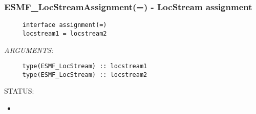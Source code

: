  
\setlength{\oldparskip}{\parskip}
\setlength{\parskip}{1.5ex}
\setlength{\oldparindent}{\parindent}
\setlength{\parindent}{0pt}
\setlength{\oldbaselineskip}{\baselineskip}
\setlength{\baselineskip}{11pt}
 
\def\bv{\begin{verbatim}}
\def\ev{\end{verbatim}}
\def\be{\begin{equation}}
\def\ee{\end{equation}}
\def\bea{\begin{eqnarray}}
\def\eea{\end{eqnarray}}
\def\bi{\begin{itemize}}
\def\ei{\end{itemize}}
\def\bn{\begin{enumerate}}
\def\en{\end{enumerate}}
\def\bd{\begin{description}}
\def\ed{\end{description}}
\def\({\left (}
\def\){\right )}
\def\[{\left [}
\def\]{\right ]}
\def\<{\left  \langle}
\def\>{\right \rangle}
\def\cI{{\cal I}}
\def\diag{\mathop{\rm diag}}
\def\tr{\mathop{\rm tr}}


 
\subsubsection [ESMF\_LocStreamAssignment(=)] {ESMF\_LocStreamAssignment(=) - LocStream assignment}


  
\begin{verbatim}     interface assignment(=)
     locstream1 = locstream2\end{verbatim}{\em ARGUMENTS:}
\begin{verbatim}     type(ESMF_LocStream) :: locstream1
     type(ESMF_LocStream) :: locstream2\end{verbatim}
{\sf STATUS:}
   \begin{itemize}
   \item{}
   \end{itemize}
  
